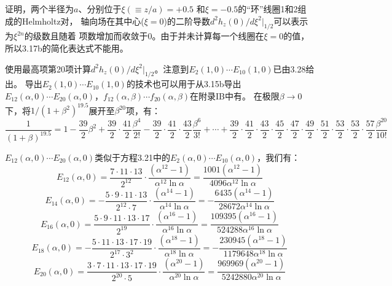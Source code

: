 证明，两个半径为$a$、分别位于$\xi(\equiv z/a)=+0.5$ 和$\xi=−0.5$的“环”线圈1和2组成的Helmholtz对，
轴向场在其中心($\xi=0$)的二阶导数$d^2 h_z(0)/d\xi^2|_{1/2}$可以表示为$\xi^{2n}$的级数且随着
项数增加而收敛于0。由于并未计算每一个线圈在$\xi=0$的值，所以3.17b的简化表达式不能用。


使用最高项第20项计算$d^2 h_z(0)/d\xi^2|_{1/2}$。注意到$E_2(1, 0)\cdots E_{10}(1, 0)$已由3.28给出。
导出$E_2(1, 0)\cdots E_{10}(1, 0)$的技术也可以用于从3.15b导出$E_{12}(\alpha, 0)\cdots E_{20}(\alpha, 0)$，$f_{12}(\alpha,\beta)\cdots f_{20}(\alpha,\beta)$在附录IB中有。
在极限$\beta\rightarrow 0$下，将$1/(1+\beta^2)^{19.5}$展开至$\beta^{20}$项，有：
\begin{equation}%
\frac{1}{(1+\beta)^{19.5}}=1-\frac{39}{2}\beta^2+\frac{39}{2}\cdot\frac{41}{2}\frac{\beta^4}{2!}-\frac{39}{2}\cdot\frac{41}{2}\cdot\frac{43}{2}\frac{\beta^6}{3!}+\cdots
+\frac{39}{2}\cdot\frac{41}{2}\cdot\frac{43}{2}\cdot\frac{45}{2}\cdot\frac{47}{2}\cdot\frac{49}{2}\cdot\frac{51}{2}\cdot\frac{53}{2}
\cdot\frac{53}{2}\cdot\frac{57}{2}\frac{\beta^{20}}{10!}
\end{equation}

$E_{12}(\alpha, 0)\cdots E_{20}(\alpha, 0)$类似于方程3.21中的$E_{2}(\alpha, 0)\cdots E_{10}(\alpha, 0)$，我们有：
\begin{equation}%
E_{12}(\alpha,0)=\frac{7\cdot11\cdot13}{2^{12}}\cdot\frac{(\alpha^{12}-1)}{\alpha^{12}\ln\alpha}=\frac{1001(\alpha^{12}-1)}{4096\alpha^{12}\ln\alpha}
\end{equation}
\begin{equation}%
E_{14}(\alpha,0)=-\frac{5\cdot9\cdot11\cdot13}{2^{12}\cdot7}\cdot\frac{(\alpha^{14}-1)}{\alpha^{14}\ln\alpha}=-\frac{6435(\alpha^{14}-1)}{28672\alpha^{14}\ln\alpha}
\end{equation}
\begin{equation}%
E_{16}(\alpha,0)=\frac{5\cdot9\cdot11\cdot13\cdot17}{2^{19}}\cdot\frac{(\alpha^{16}-1)}{\alpha^{16}\ln\alpha}=\frac{109395(\alpha^{16}-1)}{524288\alpha^{16}\ln\alpha}
\end{equation}
\begin{equation}%
E_{18}(\alpha,0)=-\frac{5\cdot11\cdot13\cdot17\cdot19}{2^{17}\cdot3^2}\cdot\frac{(\alpha^{18}-1)}{\alpha^{18}\ln\alpha}=-\frac{230945(\alpha^{18}-1)}{1179648\alpha^{18}\ln\alpha}
\end{equation}
\begin{equation}%
E_{20}(\alpha,0)=\frac{3\cdot7\cdot11\cdot13\cdot17\cdot19}{2^{20}\cdot5}\cdot\frac{(\alpha^{20}-1)}{\alpha^{20}\ln\alpha}=\frac{969969(\alpha^{20}-1)}{5242880\alpha^{20}\ln\alpha}
\end{equation}

